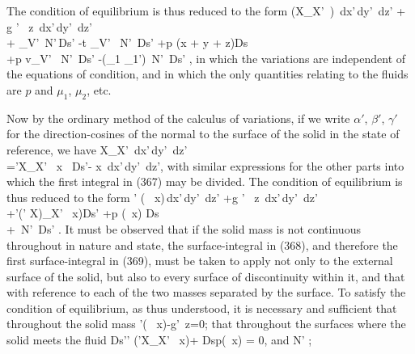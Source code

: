 \documentclass[12pt]{memoir}
\begin{document}
The condition of equilibrium is thus reduced to the form
\eqs \int \int \int \left(X_{X'}\, \delta {} \right) \,dx'\,dy'\, dz' + \int \int \int g \Gamma' \, \delta z \,dx'\,dy'\, dz'\\
+ \int \epsilon_{V'} \,\delta N'\,Ds' -\int t \eta_{V'} \, \delta N'\, Ds' +\int p \left(\alpha \delta x + \beta \delta y + \gamma \delta z\right)Ds\\
+\int p v_{V'} \, \delta N'\, Ds' -\int (\mu_1 \Gamma_1')\, \delta N'\, Ds'  , \label{367}\eqe
in which the variations are independent of the equations of condition, and in which the only quantities relating to the fluids are $p$ and $\mu_1$, $\mu_2$, etc.


Now by the ordinary method of the calculus of variations, if we write $\alpha'$, $\beta'$, $\gamma'$ for the direction-cosines of the normal to the surface of the solid in the state of reference, we have
\eqs \int \int \int X_{X'} \delta {} \,dx'\,dy'\, dz'\\
=\int \alpha'X_{X'} \, \delta x \, Ds'-\int \int \int  {} \delta x \,dx'\,dy'\, dz', \label{368}\eqe
with similar expressions for the other parts into which the first integral in (367) may be divided. The condition of equilibrium is thus reduced to the form
\eqs \int \int \int \sum \sum\nolimits' \left(  \, \delta x\right)\,dx'\,dy'\, dz'
+\int \int \int g \Gamma' \, \delta z \,dx'\,dy'\, dz'\\
+\int \sum \sum\nolimits'(\alpha' X)_{X'} \, \delta x)Ds' +\int p \sum (\alpha \, \delta x) Ds\\
+\int {} \, \delta N'\, Ds' .   \label{369}\eqe
It must be observed that if the solid mass is not continuous throughout in nature and state, the surface-integral in (368), and therefore the first surface-integral in (369), must be taken to apply not only to the external surface of the solid, but also to every surface of discontinuity within it, and that with reference to each of the two masses separated by the surface. To satisfy the condition of equilibrium, as thus understood, it is necessary and sufficient that throughout the solid mass
\eqs \sum \sum\nolimits'\left(  \, \delta x\right)-g\Gamma' \,\delta z=0;       \label{370}\eqe
that throughout the surfaces where the solid meets the fluid
\eqs Ds'\sum \sum\nolimits' (\alpha'X_{X'} \, \delta x)+ Dsp\sum(\alpha \, \delta x) = 0,  \label{371}\eqe
and   \eqs {} \delta N' ; \label{372}\eqe
\end{document}
